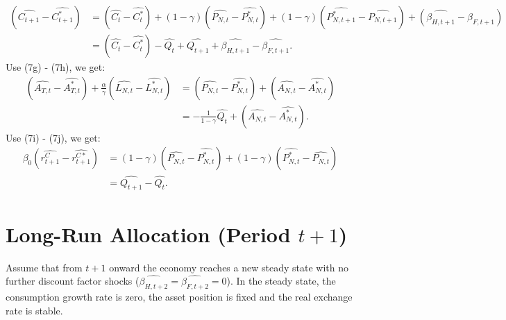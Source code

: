 \documentclass[a4paper,12pt]{article} %
\theoremstyle{nonitalic}
\begin{document}
\begin{align*}
    (\widehat{C_{t+1}} - \widehat{C_{t+1}^*}) &= (\widehat{C_t} - \widehat{C_t^*}) + (1-\gamma)(\widehat{P_{N,t}} - \widehat{P_{N,t}^*}) + (1-\gamma)(\widehat{P_{N,t+1}^*} - \widehat{P_{N,t+1}}) + (\widehat{\beta_{H, t+1}} - \widehat{\beta_{F, t+1}}) \\
    &= (\widehat{C_t} - \widehat{C_t^*}) - \widehat{Q_t} + \widehat{Q_{t+1}} + \widehat{\beta_{H, t+1}} - \widehat{\beta_{F, t+1}} \tag{9c}.
\end{align*}
Use (7g) - (7h), we get:
\begin{align*}
    (\widehat{A_{T,t}} - \widehat{A_{T,t}^*}) + \frac{\alpha}{\gamma}(\widehat{L_{N,t}} - \widehat{L_{N,t}^*}) &= (\widehat{P_{N,t}} - \widehat{P_{N,t}^*}) + (\widehat{A_{N,t}} - \widehat{A_{N,t}^*}) \\
    &= - \frac{1}{1-\gamma} \widehat{Q_t} + (\widehat{A_{N,t}} - \widehat{A_{N,t}^*}) \tag{9d}.
\end{align*}
Use (7i) - (7j), we get:
\begin{align*}
    \beta_0(\widehat{r_{t+1}^C} - \widehat{r_{t+1}^{C*}}) &= (1-\gamma)(\widehat{P_{N,t}} - \widehat{P_{N,t}^*}) + (1-\gamma)(\widehat{P_{N,t}^*} - \widehat{P_{N,t}}) \\
    &= \widehat{Q_{t+1}} - \widehat{Q_t} \tag{9e}.
\end{align*}



\section{Long-Run Allocation (Period $t+1$)}

Assume that from $ t+1 $ onward the economy reaches a new steady state with no further discount factor shocks ($ \widehat{\beta_{H,t+2}} = \widehat{\beta_{F,t+2}} = 0 $).
In the steady state, the consumption growth rate is zero, the asset position is fixed and the real exchange rate is stable. 
\end{document}
